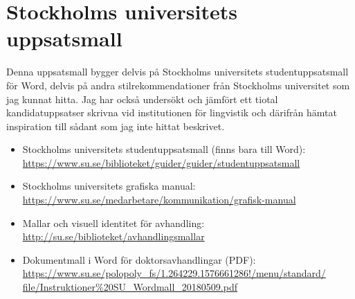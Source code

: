 
\section{Stockholms universitets uppsatsmall}
\label{utseende}

Denna uppsatsmall bygger delvis på Stockholms universitets studentuppsatsmall
för Word, delvis på andra stilrekommendationer från Stockholms universitet som
jag kunnat hitta. Jag har också undersökt och jämfört ett tiotal
kandidatuppsatser skrivna vid institutionen för lingvistik och därifrån hämtat
inspiration till sådant som jag inte hittat beskrivet.

\medskip

\begin{itemize}
\raggedright
\item Stockholms universitets studentuppsatsmall (finns bara till Word):
  \url{https://www.su.se/biblioteket/guider/guider/studentuppsatsmall}

\item Stockholms universitets grafiska manual:
  \url{https://www.su.se/medarbetare/kommunikation/grafisk-manual}

\item Mallar och visuell identitet för avhandling:
  \url{http://su.se/biblioteket/avhandlingsmallar}

\item Dokumentmall i Word för doktorsavhandlingar (PDF):
  \url{https://www.su.se/polopoly\_fs/1.264229.1576661286!/menu/standard/
    file/Instruktioner%
\end{itemize}





